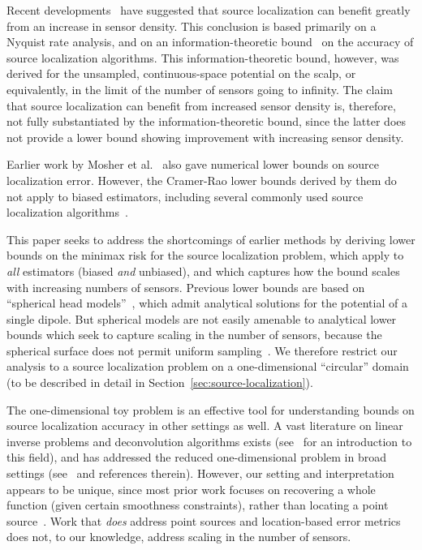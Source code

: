 \documentclass[conference]{IEEEtran}
\begin{document}
Recent developments~\cite{Grover2016Information} have suggested that source
localization can benefit greatly from an increase in sensor density. This
conclusion is based primarily on a Nyquist rate analysis, and on an
information-theoretic bound~\cite{Grover2016Fundamental} on the accuracy of
source localization algorithms. This information-theoretic bound, however, was
derived for the unsampled, continuous-space potential on the scalp, or
equivalently, in the limit of the number of sensors going to infinity. The
claim that source localization can benefit from increased sensor density is,
therefore, not fully substantiated by the information-theoretic bound, since
the latter does not provide a lower bound showing improvement with increasing
sensor density.

Earlier work by Mosher et al.~\cite{Mosher1993Error} also gave numerical lower
bounds on source localization error. However, the Cramer-Rao lower bounds
derived by them do not apply to biased estimators, including several commonly
used source localization
algorithms~\cite{Hamalainen1994Interpreting,Lin2006Assessing}.

This paper seeks to address the shortcomings of earlier methods by deriving
lower bounds on the minimax risk for the source localization problem, which
apply to \emph{all} estimators (biased \emph{and} unbiased), and which captures
how the bound scales with increasing numbers of sensors. Previous lower bounds
are based on ``spherical head
models''~\cite{Nunez2006Electric,Grover2016Information}, which admit analytical
solutions for the potential of a single dipole. But spherical models are not
easily amenable to analytical lower bounds which seek to capture scaling in the
number of sensors, because the spherical surface does not permit uniform
sampling~\cite{Heath1956Thirteen}. We therefore restrict our analysis to a
source localization problem on a one-dimensional ``circular'' domain (to be
described in detail in Section~\ref{sec:source-localization}).

The one-dimensional toy problem is an effective tool for understanding bounds
on source localization accuracy in other settings as well. A vast literature on
linear inverse problems and deconvolution algorithms exists
(see~\cite{Bal2012Introduction} for an introduction to this field), and has
addressed the reduced one-dimensional problem in broad settings
(see~\cite{Cavalier2002Sharp,Efromovich1997Robust,Ibragimov1981Statistical} and
references therein). However, our setting and interpretation appears to be
unique, since most prior work focuses on recovering a whole function (given
certain smoothness constraints), rather than locating a point
source~\cite{Cavalier2002Sharp}. Work that \emph{does} address point sources
and location-based error metrics~\cite{Ibragimov1981Statistical} does not, to
our knowledge, address scaling in the number of sensors.
\end{document}
